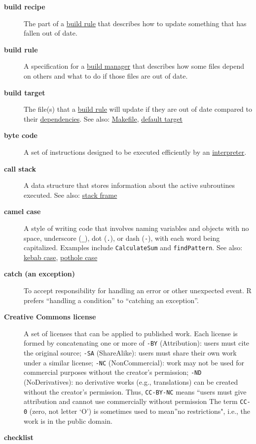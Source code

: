 \documentclass[
]{krantz}
\begin{document}
\begin{description}
\item[\textbf{build recipe}]
The part of a \protect\hyperlink{build_rule}{build rule} that describes how to update something that has fallen out of date.
\item[\textbf{build rule}]
A specification for a \protect\hyperlink{build_manager}{build manager} that describes how some files depend on others and what to do if those files are out of date.
\item[\textbf{build target}]
The file(s) that a \protect\hyperlink{build_rule}{build rule} will update if they are out of date compared to their \protect\hyperlink{dependency}{dependencies}. See also: \protect\hyperlink{makefile}{Makefile}, \protect\hyperlink{default_target}{default target}
\item[\textbf{byte code}]
A set of instructions designed to be executed efficiently by an \protect\hyperlink{interpreter}{interpreter}.
\item[\textbf{call stack}]
A data structure that stores information about the active subroutines executed. See also: \protect\hyperlink{stack_frame}{stack frame}
\item[\textbf{camel case}]
A style of writing code that involves naming variables and objects with no space, underscore (\texttt{\_}), dot (\texttt{.}), or dash (\texttt{-}), with each word being capitalized. Examples include \texttt{CalculateSum} and \texttt{findPattern}. See also: \protect\hyperlink{kebab_case}{kebab case}, \protect\hyperlink{pothole_case}{pothole case}
\item[\textbf{catch (an exception)}]
To accept responsibility for handling an error or other unexpected event. R prefers ``handling a condition'' to ``catching an exception''.
\item[\textbf{Creative Commons license}]
A set of licenses that can be applied to published work. Each license is formed by concatenating one or more of \texttt{-BY} (Attribution): users must cite the original source; \texttt{-SA} (ShareAlike): users must share their own work under a similar license; \texttt{-NC} (NonCommercial): work may not be used for commercial purposes without the creator's permission; \texttt{-ND} (NoDerivatives): no derivative works (e.g., translations) can be created without the creator's permission. Thus, \texttt{CC-BY-NC} means ``users must give attribution and cannot use commercially without permission The term \texttt{CC-0} (zero, not letter `O') is sometimes used to mean''no restrictions", i.e., the work is in the public domain.
\item[\textbf{checklist}]

\end{description}
\end{document}

